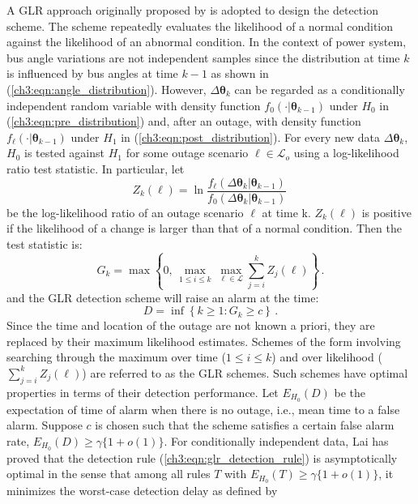 A GLR approach originally proposed by \cite{lorden1971procedures} is adopted to design the detection scheme. The scheme repeatedly evaluates the likelihood of a normal condition against the likelihood of an abnormal condition. In the context of power system, bus angle variations are not independent samples since the distribution at time $k$ is influenced by bus angles at time $k-1$ as shown in (\ref{ch3:eqn:angle_distribution}). However, $\Delta\boldsymbol{\theta}_k$ can be regarded as a conditionally independent random variable with density function $f_0(\cdot | \boldsymbol{\theta}_{k-1})$ under $H_0$ in (\ref{ch3:eqn:pre_distribution}) and, after an outage, with density function $f_{\ell}(\cdot | \boldsymbol{\theta}_{k-1})$ under $H_1$ in (\ref{ch3:eqn:post_distribution}). For every new data $\Delta\boldsymbol{\theta}_k$, $H_0$ is tested against $H_1$ for some outage scenario $\ell \in \mathcal{L}_o$ using a log-likelihood ratio test statistic. In particular, let 
\begin{equation}
\label{ch3:eqn:log_likelihood_ratio}
Z_k(\ell) = \ln \frac{f_{\ell}(\Delta\boldsymbol{\theta}_{k} | \boldsymbol{\theta}_{k-1})}{f_{0}(\Delta\boldsymbol{\theta}_{k} | \boldsymbol{\theta}_{k-1})} \,
\end{equation} be the log-likelihood ratio of an outage scenario $\ell$ at time k. $Z_k(\ell)$ is positive if the likelihood of a change is larger than that of a normal condition. Then the test statistic is:
\begin{equation}
\label{ch3:eqn:glr_statistic_direct}
G_k = \max \left\lbrace  0, \, \underset{1\le i \le k}{\max} \, \underset{\ell \in \mathcal{L}}{\max} \sum_{j=i}^{k} Z_{j}(\ell)  \right\rbrace\,.
\end{equation}
and the GLR detection scheme will raise an alarm at the time:
\begin{equation}
\label{ch3:eqn:glr_detection_rule}
D = \inf \left\lbrace  k \ge 1: G_k \ge c \right\rbrace \,.
\end{equation}
Since the time and location of the outage are not known a priori, they are replaced by their maximum likelihood estimates. Schemes of the form involving searching through the maximum over time ($1\le i \le k$) and over likelihood ($\sum_{j=i}^{k} Z_{j}(\ell)$) are referred to as the GLR schemes. Such schemes have optimal properties in terms of their detection performance. Let $E_{H_0}(D)$ be the expectation of time of alarm when there is no outage, i.e., mean time to a false alarm. Suppose $c$ is chosen such that the scheme satisfies a certain false alarm rate, $E_{H_0}(D) \ge \gamma\{ 1 + o(1) \}$. For conditionally independent data, Lai has proved that the detection rule (\ref{ch3:eqn:glr_detection_rule}) is asymptotically optimal in the sense that among all rules \(T\) with \(E_{H_0}(T) \geq \gamma\{ 1 + o(1)\}\), it minimizes the worst-case detection delay as defined by
